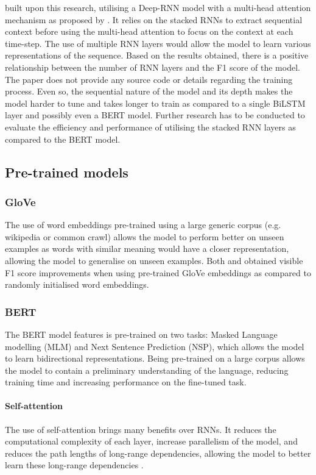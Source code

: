 \documentclass[a4paper]{article}
\begin{document}
\cite{kim_2019} built upon this research, utilising a Deep-RNN model with a multi-head attention mechanism as proposed by \cite{attentionisallyouneed}. It relies on the stacked RNNs to extract sequential context before using the multi-head attention to focus on the context at each time-step. The use of multiple RNN layers would allow the model to learn various representations of the sequence. Based on the results obtained, there is a positive relationship between the number of RNN layers and the F1 score of the model. The paper does not provide any source code or details regarding the training process. Even so, the sequential nature of the model and its depth makes the model harder to tune and takes longer to train as compared to a single BiLSTM layer and possibly even a BERT model. Further research has to be conducted to evaluate the efficiency and performance of utilising the stacked RNN layers as compared to the BERT model.

\subsection{Pre-trained models}
\subsubsection{GloVe}
The use of word embeddings pre-trained using a large generic corpus (e.g. wikipedia or common crawl) allows the model to perform better on unseen examples as words with similar meaning would have a closer representation, allowing the model to generalise on unseen examples.
Both \citet{birnnattention} and \citet{kim_2019} obtained visible F1 score improvements when using pre-trained GloVe \citep{glove} embeddings as compared to randomly initialised word embeddings. 
\subsubsection{BERT}
The BERT model features is pre-trained on two tasks: Masked Language modelling (MLM) and Next Sentence Prediction (NSP), which allows the model to learn bidirectional representations. Being pre-trained on a large corpus allows the model to contain a preliminary understanding of the language, reducing training time and increasing performance on the fine-tuned task.
\paragraph{Self-attention}
The use of self-attention brings many benefits over RNNs. It reduces the computational complexity of each layer, increase parallelism of the model, and reduces the path lengths of long-range dependencies, allowing the model to better learn these long-range dependencies \citep{attentionisallyouneed}.
\end{document}
